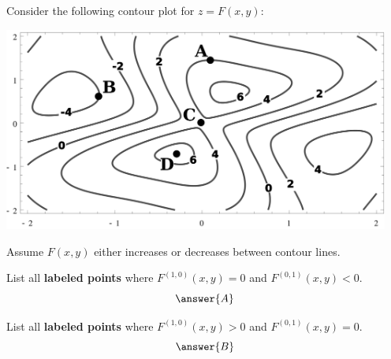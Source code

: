 \documentclass{ximera}
\author{Bart Snapp}
\begin{document}
\begin{exercise}
Consider the following contour plot for $z=F(x,y)$:
\begin{image}
\includegraphics[width=5in]{contours2.png}
\end{image}
Assume $F(x,y)$ either increases or decreases between contour lines.

List all \textbf{labeled points} where $F^{(1,0)}(x,y) = 0$ and
$F^{(0,1)}(x,y)<0$.
\[
\answer{A}
\]

  
List all \textbf{labeled points} where $F^{(1,0)}(x,y) >0$ and
$F^{(0,1)}(x,y)=0$.
\[
\answer{B}
\]
\end{exercise}
\end{document}
